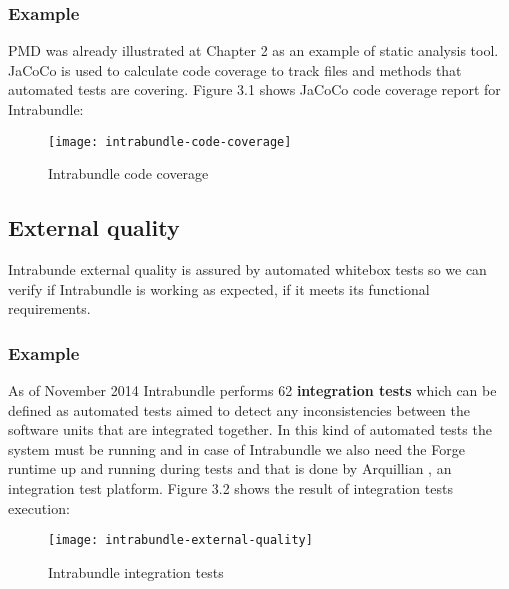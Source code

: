 \subsubsection{Example}
 PMD was already illustrated at Chapter 2 as an example of static analysis tool. JaCoCo is used to calculate code coverage to track files and methods that automated tests are covering. Figure 3.1 shows JaCoCo code coverage report for Intrabundle:

\begin{figure}[h]
\caption{Intrabundle code coverage}
\texttt{[image: intrabundle-code-coverage]}
\end{figure}

\FloatBarrier

\subsection{External quality}
Intrabunde external quality is assured by automated whitebox tests so we can verify if Intrabundle is working as expected, if it meets its functional requirements.

\subsubsection{Example}
As of November 2014 Intrabundle performs 62 \textbf{integration tests} which can be defined as automated tests aimed to detect any inconsistencies between the software units that are integrated together. In this kind of automated tests the system must be running and in case of Intrabundle we also need the Forge runtime up and running during tests and that is done by Arquillian \citep{dan 2011}, an integration test platform. Figure 3.2 shows the result of integration tests execution:

\begin{figure}[h]
\caption{Intrabundle integration tests}
\texttt{[image: intrabundle-external-quality]}
\end{figure}

\FloatBarrier